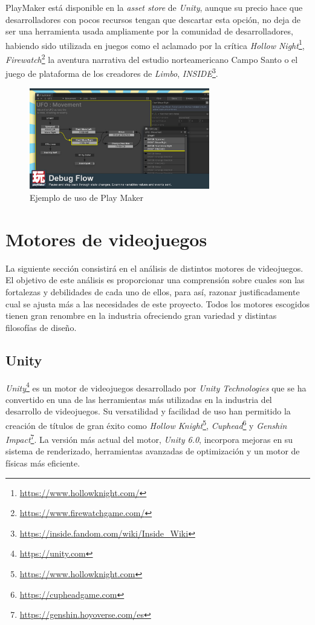 PlayMaker está disponible en la \textit{asset store} de \textit{Unity}, aunque su precio hace que desarrolladores con pocos recursos tengan que descartar esta opción, no deja de ser una herramienta usada ampliamente por la comunidad de desarrolladores, habiendo sido utilizada en juegos como el aclamado por la crítica \textit{Hollow Night}\footnote{\url{https://www.hollowknight.com/}}, \textit{Firewatch}\footnote{\url{https://www.firewatchgame.com/}} la aventura narrativa del estudio norteamericano Campo Santo o el juego de plataforma de los creadores de \textit{Limbo}, \textit{INSIDE}\footnote{\url{https://inside.fandom.com/wiki/Inside_Wiki}}.\\

\begin{figure}[t]
	\centering
	\includegraphics[width = 0.7\textwidth]{Imagenes/PlayMaker.jpg}
	\caption{Ejemplo de uso de Play Maker}
	\label{fig:PlayMaker_Figure}
\end{figure}

\section{Motores de videojuegos}

La siguiente sección consistirá en el análisis de distintos motores de videojuegos. El objetivo  de este análisis es proporcionar una comprensión sobre cuales son las fortalezas y debilidades de cada uno de ellos, para así, razonar justificadamente cual se ajusta más a las necesidades de este proyecto. Todos los motores escogidos tienen gran renombre en la industria ofreciendo gran variedad y distintas filosofías de diseño.
\subsection{Unity}
\textit{Unity}\footnote{\url{https://unity.com}} es un motor de videojuegos desarrollado por \textit{Unity Technologies} que se ha convertido en una de las herramientas más utilizadas en la industria del desarrollo de videojuegos. Su versatilidad y facilidad de uso han permitido la creación de títulos de gran éxito como \textit{Hollow Knight}\footnote{\url{https://www.hollowknight.com}}, \textit{Cuphead}\footnote{\url{https://cupheadgame.com}} y \textit{Genshin Impact}\footnote{\url{https://genshin.hoyoverse.com/es}}. La versión más actual del motor, \textit{Unity 6.0}, incorpora mejoras en su sistema de renderizado, herramientas avanzadas de optimización y un motor de físicas más eficiente.\\

